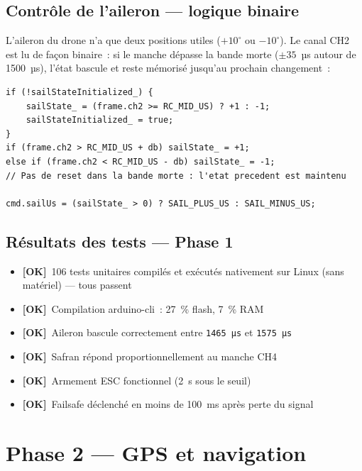 \documentclass[12pt,a4paper]{article}
\newcommand{\us}[1]{\texttt{#1\,µs}}
\newcommand{\done}{\textcolor{okborder}{\textbf{[OK]}}}
\begin{document}
\subsection{Contrôle de l'aileron — logique binaire}

L'aileron du drone n'a que deux positions utiles ($+10^{\circ}$ ou $-10^{\circ}$).
Le canal CH2 est lu de façon binaire~: si le manche dépasse la bande
morte ($\pm35$~µs autour de 1500~µs), l'état bascule et reste mémorisé
jusqu'au prochain changement~:

\begin{lstlisting}[style=cpp, caption={Logique aileron binaire avec etat memorise}]
if (!sailStateInitialized_) {
    sailState_ = (frame.ch2 >= RC_MID_US) ? +1 : -1;
    sailStateInitialized_ = true;
}
if (frame.ch2 > RC_MID_US + db) sailState_ = +1;
else if (frame.ch2 < RC_MID_US - db) sailState_ = -1;
// Pas de reset dans la bande morte : l'etat precedent est maintenu

cmd.sailUs = (sailState_ > 0) ? SAIL_PLUS_US : SAIL_MINUS_US;
\end{lstlisting}

\subsection{Résultats des tests — Phase 1}

\begin{itemize}
  \item \done\ 106 tests unitaires compilés et exécutés nativement sur Linux
    (sans matériel) — tous passent
  \item \done\ Compilation arduino-cli~: 27~\% flash, 7~\% RAM
  \item \done\ Aileron bascule correctement entre \us{1465} et \us{1575}
  \item \done\ Safran répond proportionnellement au manche CH4
  \item \done\ Armement ESC fonctionnel (2~s sous le seuil)
  \item \done\ Failsafe déclenché en moins de 100~ms après perte du signal
\end{itemize}

\section{Phase 2 — GPS et navigation}
\end{document}
